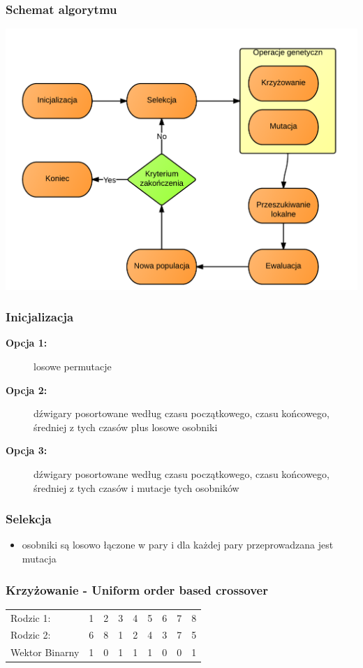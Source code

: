 \documentclass{beamer}
\begin{document}
\begin{frame}
 \frametitle{Schemat algorytmu}
 \begin{center}
 \includegraphics[scale=0.18]{./Grafika/schemat.png}
\end{center}

\end{frame}

\begin{frame}
 \frametitle{Inicjalizacja}
 \begin{description}
  \item[\textbf{Opcja 1:}] losowe permutacje
  \item[\textbf{Opcja 2:}] dźwigary posortowane według czasu początkowego, czasu końcowego, średniej z tych czasów plus losowe osobniki
  \item[\textbf{Opcja 3:}]  dźwigary posortowane według czasu początkowego, czasu końcowego, średniej z tych czasów i mutacje tych osobników
  \end{description}
\end{frame}

\begin{frame}
 \frametitle{Selekcja}
 \begin{itemize}
  \item osobniki są losowo łączone w pary i dla każdej pary przeprowadzana jest mutacja
 \end{itemize}

\end{frame}

\begin{frame}
 \frametitle{Krzyżowanie - Uniform order based crossover}
\begin{center}
\begin{tabular}{lllllllll}
Rodzic 1: & 1 & 2 & 3 & 4 & 5 & 6 & 7 & 8\\
Rodzic 2: & 6 & 8 & 1 & 2 & 4 & 3 & 7 & 5\\
Wektor Binarny & 1 & 0 & 1 & 1 & 1 & 0 & 0 & 1
\end{tabular}
\end{center}

 

\end{frame}
\end{document}
